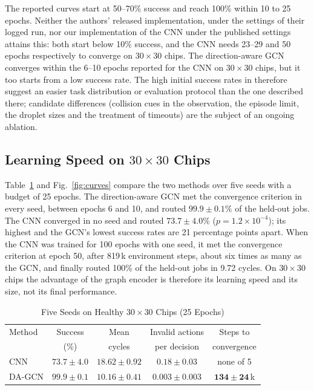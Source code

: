 \documentclass[conference,onecolumn,11pt]{IEEEtran}
\begin{document}
The reported curves start at 50--70\% success and reach 100\% within 10 to 25 epochs.
Neither the authors' released implementation, under the settings of their logged run, nor
our implementation of the CNN under the published settings attains this: both start below
10\% success, and the CNN needs 23--29 and 50 epochs respectively to converge on
$30\times30$ chips. The direction-aware GCN converges within the 6--10 epochs reported for
the CNN on $30\times30$ chips, but it too starts from a low success rate. The high initial
success rates in \cite{elfar2023} therefore suggest an easier task distribution or
evaluation protocol than the one described there; candidate differences (collision cues
in the observation, the episode limit, the droplet sizes and the treatment of timeouts) are
the subject of an ongoing ablation.

\subsection{Learning Speed on $30\times30$ Chips}
Table~\ref{tab:seeds30} and Fig.~\ref{fig:curves} compare the two methods over five seeds
with a budget of 25 epochs. The direction-aware GCN met the convergence criterion in every
seed, between epochs 6 and 10, and routed $99.9\pm0.1\%$ of the held-out jobs. The CNN
converged in no seed and routed $73.7\pm4.0\%$ ($p=1.2\times10^{-4}$); its highest and the
GCN's lowest success rates are 21 percentage points apart. When the CNN was trained for
100 epochs with one seed, it met the convergence criterion at epoch 50, after 819\,k
environment steps, about six times as many as the GCN, and finally routed 100\% of the
held-out jobs in 9.72 cycles. On $30\times30$ chips the advantage of the graph encoder is
therefore its learning speed and its size, not its final performance.

\begin{table}[!htbp]
\caption{Five Seeds on Healthy $30\times30$ Chips (25 Epochs)}
\label{tab:seeds30}
\centering\footnotesize
\setlength{\tabcolsep}{3pt}
\begin{tabular}{@{}lcccc@{}}
\toprule
Method & Success & Mean & Invalid actions & Steps to \\
 & (\%) & cycles & per decision & convergence \\ \midrule
CNN & $73.7\pm4.0$ & $18.62\pm0.92$ & $0.18\pm0.03$ & none of 5 \\
DA-GCN & $\mathbf{99.9\pm0.1}$ & $\mathbf{10.16\pm0.41}$ & $\mathbf{0.003\pm0.003}$ & $\mathbf{134\pm24}$\,k \\
\bottomrule
\end{tabular}
\end{table}
\end{document}
